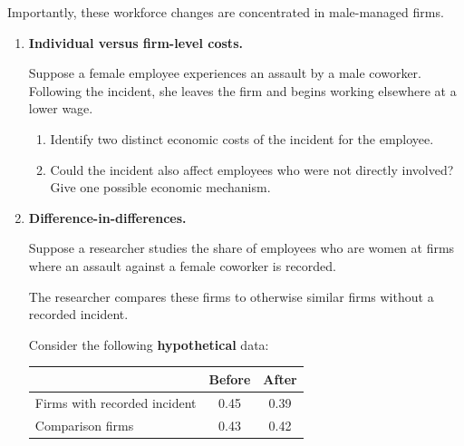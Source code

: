 \documentclass[12pt]{article}
\begin{document}
Importantly, these workforce changes are concentrated
in male-managed firms.

\begin{enumerate}

\item \textbf{Individual versus firm-level costs.}

Suppose a female employee experiences an assault
by a male coworker. Following the incident,
she leaves the firm and begins working elsewhere
at a lower wage.

\begin{enumerate}

\item Identify two distinct economic costs of the
incident for the employee.

\vspace{4cm}

\item Could the incident also affect employees
who were not directly involved?
Give one possible economic mechanism.

\vspace{4cm}

\end{enumerate}

\vspace{1cm}

\item \textbf{Difference-in-differences.}

Suppose a researcher studies the share of employees
who are women at firms where an assault against
a female coworker is recorded.

The researcher compares these firms to otherwise
similar firms without a recorded incident.

Consider the following \textbf{hypothetical} data:

\begin{center}
\begin{tabular}{lcc}
\toprule
& Before & After \\
\midrule
Firms with recorded incident & 0.45 & 0.39 \\
Comparison firms & 0.43 & 0.42 \\
\bottomrule
\end{tabular}
\end{center}


\end{enumerate}
\end{document}
